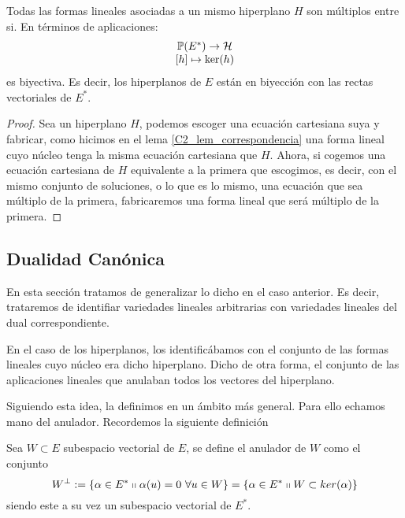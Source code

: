 \begin{lem}
	Todas las formas lineales asociadas a un mismo hiperplano $H$ son múltiplos entre si. En términos de aplicaciones:
	\[\begin{array}{c}
	\mathbb{P}(E^*)\to\mathcal{H}\\
	\left [ h \right ]\mapsto \ker(h)
	\end{array}
	\]
	es biyectiva. Es decir, los hiperplanos de $E$ están en biyección con las rectas vectoriales de $E^*$.
\end{lem}
\begin{proof}
	Sea un hiperplano $H$, podemos escoger una ecuación cartesiana suya y fabricar, como hicimos en el lema \ref{C2_lem_correspondencia} una forma lineal cuyo núcleo tenga la misma ecuación cartesiana que $H$. Ahora, si cogemos una ecuación cartesiana de $H$ equivalente a la primera que escogimos, es decir, con el mismo conjunto de soluciones, o lo que es lo mismo, una ecuación que sea múltiplo de la primera, fabricaremos una forma lineal que será múltiplo de la primera.
\end{proof}

\subsection{Dualidad Canónica}
En esta sección tratamos de generalizar lo dicho en el caso anterior. Es decir, trataremos de identifiar variedades lineales arbitrarias con variedades lineales del dual correspondiente.

En el caso de los hiperplanos, los identificábamos con el conjunto de las formas lineales cuyo núcleo era dicho hiperplano. Dicho de otra forma, el conjunto de las aplicaciones lineales que anulaban todos los vectores del hiperplano.

Siguiendo esta idea, la definimos en un ámbito más general. Para ello echamos mano del anulador. Recordemos la siguiente definición
\begin{defi}
	Sea $W\subset E$ subespacio vectorial de $E$, se define el anulador de $W$ como el conjunto
	\begin{equation}
	W^{\perp}:=\{\alpha\in E^*\shortparallel \alpha(u)=0 \ \forall u\in W\}=\{\alpha\in E^*\shortparallel W\subset ker(\alpha)\}
	\end{equation}
	siendo este a su vez un subespacio vectorial de $E^*$.
\end{defi}

